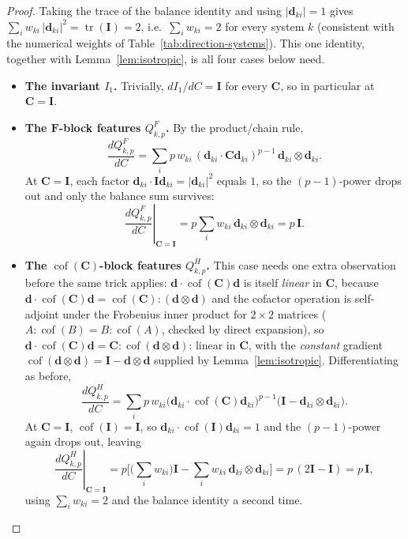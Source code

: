 \documentclass[10pt,a4paper]{article}
\newcommand{\Cof}{\operatorname{cof}}
\newcommand{\tr}{\operatorname{tr}}
\begin{document}
\begin{proof}
Taking the trace of the balance identity and using $|\bm d_{ki}|=1$ gives
$\sum_iw_{ki}\,|\bm d_{ki}|^2=\tr(\bm I)=2$, i.e.\ $\sum_iw_{ki}=2$ for every
system $k$ (consistent with the numerical weights of
Table~\ref{tab:direction-systems}). This one identity, together with
Lemma~\ref{lem:isotropic}, is all four cases below need.
\begin{itemize}
\item \textbf{The invariant $I_1$.} Trivially, $dI_1/dC=\bm I$ for every
$\bm C$, so in particular at $\bm C=\bm I$.

\item \textbf{The $\bm F$-block features $Q_{k,p}^F$.} By the
product/chain rule,
\begin{equation}
 \frac{dQ_{k,p}^F}{dC}=\sum_i p\,w_{ki}\,(\bm d_{ki}\cdot \bm C\bm d_{ki})^{p-1}\,\bm d_{ki}\otimes \bm d_{ki}.
\end{equation}
At $\bm C=\bm I$, each factor $\bm d_{ki}\cdot \bm I\bm d_{ki}=|\bm d_{ki}|^2$
equals $1$, so the $(p-1)$-power drops out and only the balance sum
survives:
\begin{equation}
 \left.\frac{dQ_{k,p}^F}{dC}\right|_{\bm C=\bm I}=p\sum_iw_{ki}\,\bm d_{ki}\otimes \bm d_{ki}=p\,\bm I.
\end{equation}

\item \textbf{The $\Cof(\bm C)$-block features $Q_{k,p}^H$.} This case
needs one extra observation before the same trick applies:
$\bm d\cdot\Cof(\bm C)\bm d$ is itself \emph{linear} in $\bm C$, because
$\bm d\cdot\Cof(\bm C)\bm d=\Cof(\bm C):(\bm d\otimes \bm d)$ and the cofactor
operation is self-adjoint under the Frobenius inner product for
$2\times2$ matrices ($A:\Cof(B)=B:\Cof(A)$, checked by direct
expansion), so $\bm d\cdot\Cof(\bm C)\bm d=\bm C:\Cof(\bm d\otimes\bm d)$: linear
in $\bm C$, with the \emph{constant} gradient
$\Cof(\bm d\otimes\bm d)=\bm I-\bm d\otimes \bm d$ supplied by
Lemma~\ref{lem:isotropic}. Differentiating as before,
\begin{equation}
 \frac{dQ_{k,p}^H}{dC}=\sum_ip\,w_{ki}\big(\bm d_{ki}\cdot\Cof(\bm C)\bm d_{ki}\big)^{p-1}
 \big(\bm I-\bm d_{ki}\otimes \bm d_{ki}\big).
\end{equation}
At $\bm C=\bm I$, $\Cof(\bm I)=\bm I$, so $\bm d_{ki}\cdot\Cof(\bm I)\bm d_{ki}=1$
and the $(p-1)$-power again drops out, leaving
\begin{equation}
 \left.\frac{dQ_{k,p}^H}{dC}\right|_{\bm C=\bm I}
 =p\Big[\Big(\textstyle\sum_iw_{ki}\Big)\bm I-\sum_iw_{ki}\,\bm d_{ki}\otimes \bm d_{ki}\Big]
 =p\,(2\bm I-\bm I)=p\,\bm I,
\end{equation}
using $\sum_iw_{ki}=2$ and the balance identity a second time.


\end{itemize}
\end{proof}
\end{document}
